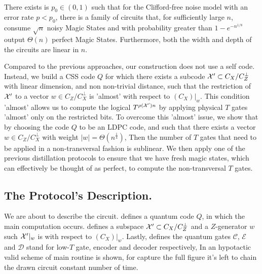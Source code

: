 \paragraph{}

\begin{theorem}
  \label{theorem:main}
There exists is $p_0 \in (0,1)$ such that for the Clifford-free noise model with an error rate $p < p_{0}$, there is a family of circuits that, for sufficiently large $n$, consume $\sqrt{n}$ noisy Magic States and with  probability greater than $1 - e^{-n^{1/8}}$ output $\Theta(n)$ perfect Magic States. Furthermore, both the width and depth of the circuits are linear in $n$.
\end{theorem}
Compared to the previous approaches, our construction does not use a self \trig code. Instead, we build a CSS code $Q$ for which there exists a subcode $\mathcal{X}^\prime \subset C_{X}/C_{Z}^\perp$ with linear dimension, and non non-trivial distance, such that the restriction of $\mathcal{X}^\prime$ to a vector $w \in C_{Z}/C_{X}^\perp$ is 'almost' \trig with respect to $(C_{X})|_{w}$. This condition 'almost' allows us to compute the logical $T^{\rho(\mathcal{X}^\prime)n}$ by applying physical $T$ gates 'almost' only on the restricted bits. To overcome this 'almost' issue, we show that by choosing the code $Q$ to be an LDPC code, and such that there exists a vector $w\in C_{Z}/C_{X}^\perp$ with weight $|w| = \Theta(n^\frac{1}{4})$, Then the number of $T$ gates that need to be applied in a non-transversal fashion is sublinear. We then apply one of the previous distillation protocols to ensure that we have fresh magic states, which can effectively be thought of as perfect, to compute the non-transversal $T$ gates.

\subsection{The Protocol's Description.} 
We are about to describe the circuit.  defines a quantum code $Q$, in which the main computation occurs.  defines a subspace $\mathcal{X}^\prime \subset C_{X}/C_{Z}^\perp$ and a $Z$-generator $w$ such $\mathcal{X}^\prime|_{w}$ is \trig with respect to $(C_{X})|_{w}$. Lastly,  defines the quantum gates $\mathcal{C}$, $\mathcal{E}$ and $\mathcal{D}$ stand for low-$T$ gate, encoder and decoder respectively, In  an hypotactic valid scheme of main routine is shown, for capture the full figure it's left to chain the drawn circuit constant number of time. 

